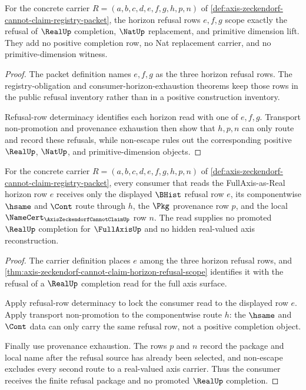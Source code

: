 \begin{theorem}
\label{thm:axis-zeckendorf-cannot-claim-horizon-refusal-scope}
For the concrete carrier $R=(a,b,c,d,e,f,g,h,p,n)$ of \autoref{def:axis-zeckendorf-cannot-claim-registry-packet}, the horizon refusal rows $e,f,g$ scope exactly the refusal of $\RealUp$ completion, $\NatUp$ replacement, and primitive dimension lift. They add no positive completion row, no Nat replacement carrier, and no primitive-dimension witness.
\end{theorem}
\begin{proof}
The packet definition names $e,f,g$ as the three horizon refusal rows. The registry-obligation and consumer-horizon-exhaustion theorems keep those rows in the public refusal inventory rather than in a positive construction inventory.

Refusal-row determinacy identifies each horizon read with one of $e,f,g$. Transport non-promotion and provenance exhaustion then show that $h,p,n$ can only route and record these refusals, while non-escape rules out the corresponding positive $\RealUp$, $\NatUp$, and primitive-dimension objects.
\end{proof}

\begin{theorem}
\label{thm:axis-zeckendorf-fullaxis-real-refusal-boundary}
For the concrete carrier $R=(a,b,c,d,e,f,g,h,p,n)$ of \autoref{def:axis-zeckendorf-cannot-claim-registry-packet}, every consumer that reads the FullAxis-as-Real horizon row $e$ receives only the displayed $\BHist$ refusal row $e$, its componentwise $\hsame$ and $\Cont$ route through $h$, the $\Pkg$ provenance row $p$, and the local $\NameCert_{\AxisZeckendorfCannotClaimUp}$ row $n$. The read supplies no promoted $\RealUp$ completion for $\FullAxisUp$ and no hidden real-valued axis reconstruction.
\end{theorem}
\begin{proof}
The carrier definition places $e$ among the three horizon refusal rows, and \autoref{thm:axis-zeckendorf-cannot-claim-horizon-refusal-scope} identifies it with the refusal of a $\RealUp$ completion read for the full axis surface.

Apply refusal-row determinacy to lock the consumer read to the displayed row $e$. Apply transport non-promotion to the componentwise route $h$: the $\hsame$ and $\Cont$ data can only carry the same refusal row, not a positive completion object.

Finally use provenance exhaustion. The rows $p$ and $n$ record the package and local name after the refusal source has already been selected, and non-escape excludes every second route to a real-valued axis carrier. Thus the consumer receives the finite refusal package and no promoted $\RealUp$ completion.
\end{proof}


